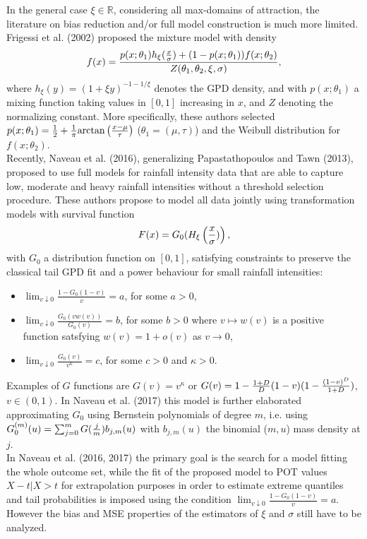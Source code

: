 \documentclass[a4paper,11pt]{article}
\begin{document}
In the general case $\xi \in \mathbb{R}$, considering all max-domains of attraction, the literature on bias reduction and/or full model construction is much more limited. Frigessi et al. (2002) proposed the mixture model with density
\[
f(x) = \frac{p(x;\theta_1)h_{\xi}({x \over \sigma}) + (1-p(x;\theta_1))f(x;\theta_2)}{Z(\theta_1, \theta_2,\xi, \sigma)},
\]
where $h_{\xi}(y) =(1+\xi y)^{-1-1/\xi }$ denotes the GPD density, 
and with $p(x;\theta_1)$ a mixing function taking values in $[0,1]$ increasing in $x$, and $Z$ denoting the normalizing constant. More specifically, these authors selected $p(x;\theta_1) = {1 \over 2} + {1 \over \pi}\mbox{arctan}\left( {x -\mu \over \tau} \right)$ ($\theta_1= (\mu,\tau)$) and the Weibull distribution for $f(x; \theta_2)$. \\
Recently, Naveau et al. (2016), generalizing Papastathopoulos and Tawn (2013),  proposed to use full models for rainfall intensity data that are able to capture low, moderate and heavy rainfall intensities without a threshold selection procedure. These authors propose to model all data jointly using transformation models with survival function 
\begin{equation}
F(x) =  G_0 (H_{\xi} \left({x \over \sigma})\right),
\label{naveau}
\end{equation}
with $G_0$ a distribution function on $[0,1]$, satisfying constraints to preserve the classical tail GPD fit and a power behaviour for small rainfall intensities:
\begin{itemize}
\item $\lim_{v \downarrow 0} \frac{1-G_0(1-v)}{v}=a$, for some $a>0$,
\item $\lim_{v \downarrow 0} \frac{G_0(v w(v))}{G_0(v)}=b$, for some $b>0$ where $v \mapsto w(v)$ is a positive function satsfying $w(v) = 1+ o(v)$ as $v \to 0$,
\item  $\lim_{v \downarrow 0} \frac{G_0(v)}{v^\kappa}=c$, for some  $c>0$ and $\kappa >0$.
\end{itemize}
Examples of $G$ functions  are $G(v)= v^\kappa$ or 
$G(v) = 1-{1+D \over D} (1-v) (1-\frac{(1-v)^D}{1+D})$, $v \in (0,1)$. 
In Naveau et al. (2017) this model is further elaborated approximating $G_0$ using Bernstein polynomials of degree $m$, i.e. using $G_{0}^{(m)} (u) = \sum_{j=0}^m G({j \over m})b_{j,m}(u)$ with $b_{j,m}(u)$ the binomial ($m,u$) mass density at $j$.  
\\
In Naveau et al. (2016, 2017) the primary goal is the search for a model fitting the whole outcome set, 
while the fit of the proposed model to POT values $X-t |X>t$ for extrapolation purposes in order to estimate extreme quantiles and tail probabilities is imposed using the condition $\lim_{v \downarrow 0} \frac{1-G_0(1-v)}{v}=a$. However the bias and MSE properties of the estimators of $\xi$ and $\sigma$ still have to be analyzed.\\
\end{document}
